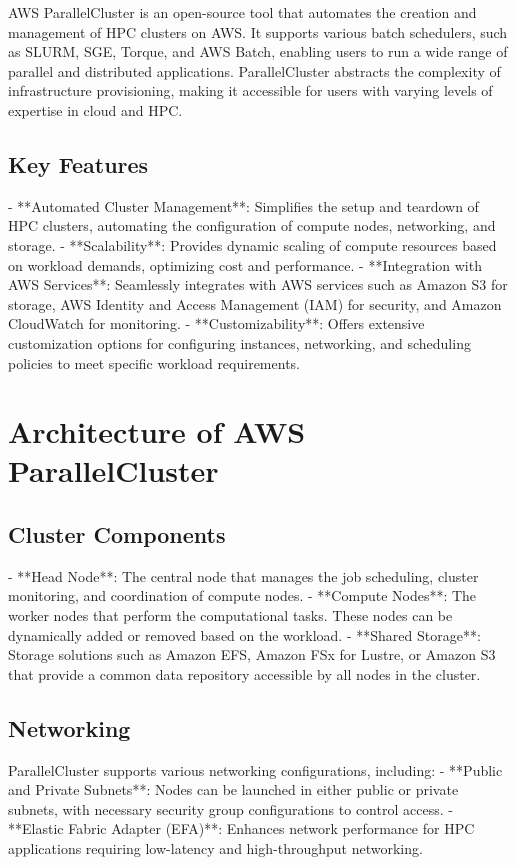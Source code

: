 AWS ParallelCluster is an open-source tool that automates the creation and management of HPC clusters on AWS. It supports various batch schedulers, such as SLURM, SGE, Torque, and AWS Batch, enabling users to run a wide range of parallel and distributed applications. ParallelCluster abstracts the complexity of infrastructure provisioning, making it accessible for users with varying levels of expertise in cloud and HPC.

\subsection{Key Features}

- **Automated Cluster Management**: Simplifies the setup and teardown of HPC clusters, automating the configuration of compute nodes, networking, and storage.
- **Scalability**: Provides dynamic scaling of compute resources based on workload demands, optimizing cost and performance.
- **Integration with AWS Services**: Seamlessly integrates with AWS services such as Amazon S3 for storage, AWS Identity and Access Management (IAM) for security, and Amazon CloudWatch for monitoring.
- **Customizability**: Offers extensive customization options for configuring instances, networking, and scheduling policies to meet specific workload requirements.

\section{Architecture of AWS ParallelCluster}

\subsection{Cluster Components}

- **Head Node**: The central node that manages the job scheduling, cluster monitoring, and coordination of compute nodes.
- **Compute Nodes**: The worker nodes that perform the computational tasks. These nodes can be dynamically added or removed based on the workload.
- **Shared Storage**: Storage solutions such as Amazon EFS, Amazon FSx for Lustre, or Amazon S3 that provide a common data repository accessible by all nodes in the cluster.

\subsection{Networking}

ParallelCluster supports various networking configurations, including:
- **Public and Private Subnets**: Nodes can be launched in either public or private subnets, with necessary security group configurations to control access.
- **Elastic Fabric Adapter (EFA)**: Enhances network performance for HPC applications requiring low-latency and high-throughput networking.

